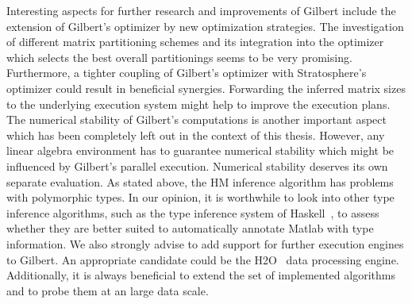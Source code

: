 Interesting aspects for further research and improvements of Gilbert include the extension of Gilbert's optimizer by new optimization strategies.
The investigation of different matrix partitioning schemes and its integration into the optimizer which selects the best overall partitionings seems to be very promising.
Furthermore, a tighter coupling of Gilbert's optimizer with Stratosphere's optimizer could result in beneficial synergies.
Forwarding the inferred matrix sizes to the underlying execution system might help to improve the execution plans.
The numerical stability of Gilbert's computations is another important aspect which has been completely left out in the context of this thesis.
However, any linear algebra environment has to guarantee numerical stability which might be influenced by Gilbert's parallel execution.
Numerical stability deserves its own separate evaluation.
As stated above, the HM inference algorithm has problems with polymorphic types.
In our opinion, it is worthwhile to look into other type inference algorithms, such as the type inference system of Haskell~\cite{haskell}, to assess whether they are better suited to automatically annotate Matlab with type information.
We also strongly advise to add support for further execution engines to Gilbert.
An appropriate candidate could be the H2O~\cite{h2o} data processing engine.
Additionally, it is always beneficial to extend the set of implemented algorithms and to probe them at an large data scale.
